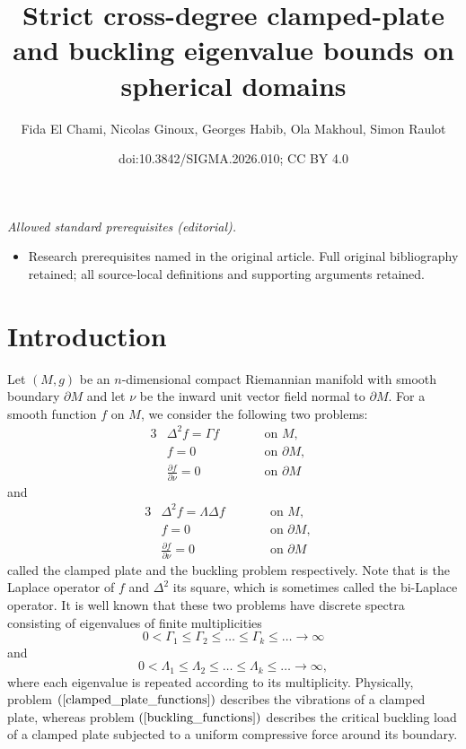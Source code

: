 \documentclass[10pt,a4paper]{amsart}
\title{Strict cross-degree clamped-plate and buckling eigenvalue bounds on spherical domains}
\author{Fida El Chami, Nicolas Ginoux, Georges Habib, Ola Makhoul, Simon Raulot}
\date{doi:10.3842/SIGMA.2026.010; CC BY 4.0}
\numberwithin{equation}{section}
\theoremstyle{definition}
\begin{document}
\maketitle
\noindent\textit{Allowed standard prerequisites (editorial).}\begin{itemize}
\item Research prerequisites named in the original article. Full original bibliography retained; all source-local definitions and supporting arguments retained.
\end{itemize}\medskip
\section{Introduction}
Let $(M,g)$ be an $n$-dimensional compact Riemannian manifold with smooth boundary $\partial M$ and let $\nu$ be the inward unit vector field normal to $\partial M$.
For a smooth function $f$ on $M$, we consider the following two problems:
\begin{alignat}{3}
&\Delta^2 f = \Gamma f\qquad && \textrm{on } M,&\nonumber\\
&f = 0 \quad && \textrm{on } \partial M,&\label{clamped_plate_functions}\\
&\frac{\partial f}{\partial\nu} = 0 \quad&& \textrm{on } \partial M&\nonumber
\end{alignat}
and
\begin{alignat}{3}
&\Delta^2 f=\Lambda \Delta f \qquad && \textrm{on } M,&\nonumber\\
&f = 0 \quad && \textrm{on } \partial M,&\label{buckling_functions}\\
&\frac{\partial f}{\partial\nu} = 0 \quad && \textrm{on } \partial M&\nonumber
\end{alignat}
called the clamped plate and the buckling problem respectively.
Note that  is the Laplace operator of $f$ and $\Delta^2 $ its square, which is sometimes called the bi-Laplace operator.
It is well known that these two problems have discrete spectra consisting of eigenvalues of finite multiplicities
\[ 0< \Gamma_1\le \Gamma_2 \le \dots \le \Gamma_k \le \dots \longrightarrow \infty\]
and
\[ 0< \Lambda_1 \le \Lambda_2 \le \dots \le \Lambda_k \le \dots \longrightarrow \infty,\]
where each eigenvalue is repeated according to its multiplicity.
Physically, problem $(\ref{clamped_plate_functions})$ describes the vibrations of a clamped plate, whereas problem $(\ref{buckling_functions})$ describes the critical buckling load of a clamped plate subjected to a uniform compressive force around its boundary.
\end{document}

